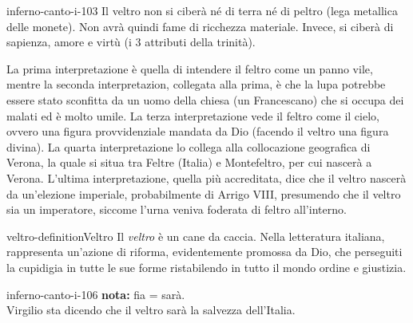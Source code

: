 \documentclass[preview]{standalone}
\begin{document}
\begin{snippet}{inferno-canto-i-103}
    Il veltro non si ciberà né di terra né di peltro (lega metallica delle monete).
    Non avrà quindi fame di ricchezza materiale.
    Invece, si ciberà di sapienza, amore e virtù (i 3 attributi della trinità).

    La prima interpretazione è quella di intendere il feltro come un panno vile,
    mentre la seconda interpretazion, collegata alla prima, è che la lupa potrebbe
    essere stato sconfitta da un uomo della chiesa (un Francescano) che si occupa dei malati
    ed è molto umile. La terza interpretazione vede il feltro come il cielo, ovvero una figura provvidenziale
    mandata da Dio (facendo il veltro una figura divina). La quarta interpretazione
    lo collega alla collocazione geografica di Verona, la quale si situa tra Feltre (Italia) e Montefeltro, per cui
    nascerà a Verona.
    L'ultima interpretazione, quella più accreditata, dice che il veltro nascerà da un'elezione imperiale,
    probabilmente di Arrigo VIII, presumendo che il veltro sia un imperatore, siccome l'urna
    veniva foderata di feltro all'interno.
\end{snippet}

\begin{snippetdefinition}{veltro-definition}{Veltro}
    Il \textit{veltro} è un cane da caccia.
    Nella letteratura italiana, rappresenta un'azione di riforma,
    evidentemente promossa da Dio, che perseguiti la cupidigia in tutte le sue forme
    ristabilendo in tutto il mondo ordine e giustizia. 
\end{snippetdefinition}

\begin{snippet}{inferno-canto-i-106}
    \textbf{\color{red}nota:} fia = sarà. \\
    Virgilio sta dicendo che il veltro sarà la salvezza dell'Italia.
\end{snippet}
\end{document}
